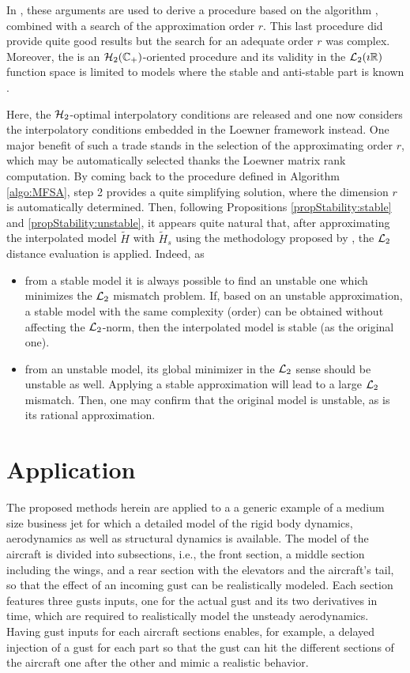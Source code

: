 \documentclass[graybox]{svmult}
\begin{document}
In \cite{PontesECC:2015}, these arguments are used to derive a procedure based on the \tfirka algorithm \cite{BeattieCDC:2012}, combined with a search of the approximation order $r$. This last procedure did provide quite good results but the search for an adequate order $r$ was complex. Moreover, the \tfirka is an ${\mathcal{H}_{2}}(\mathbb{C}_+)$-oriented procedure and its validity in the ${\mathcal{L}_{2}}(\imath\mathbb{R})$ function space is limited to models where the stable and anti-stable part is known \cite{Magruder:2010}. 

Here, the ${\mathcal{H}_{2}}$-optimal interpolatory conditions are released and one now considers the interpolatory conditions embedded in the Loewner framework instead. One major benefit of such a trade stands in the selection of the approximating order $r$, which may be automatically selected thanks the Loewner matrix rank computation. By coming back to the \mfsa procedure defined in Algorithm \ref{algo:MFSA}, step 2 provides a quite simplifying solution, where the dimension $r$ is automatically determined. Then, following Propositions \ref{propStability:stable} and \ref{propStability:unstable}, it appears quite natural that, after approximating the interpolated model $\tilde H$ with $\tilde H_s$ using the methodology proposed by \cite{Kohler:2014}, the ${\mathcal{L}_{2}}$ distance evaluation is applied. Indeed, as 
\begin{itemize}
	\item from a stable model it is always possible to find an unstable one which minimizes the ${\mathcal{L}_{2}}$ mismatch problem. If, based on an unstable approximation, a stable model with the same complexity (order) can be obtained without affecting the ${\mathcal{L}_{2}}$-norm, then the interpolated model is stable (as the original one).
	\item from an unstable model, its global minimizer in the ${\mathcal{L}_{2}}$ sense should be unstable as well. Applying a stable approximation will lead to a large ${\mathcal{L}_{2}}$ mismatch. Then, one may confirm that the original model is unstable, as is its rational approximation.
\end{itemize}


\section{Application}\label{sec:app}\vspace{-1mm}
The proposed methods herein are applied to a a generic example of a medium size business jet 
for which a detailed model of the rigid body dynamics, aerodynamics as well as structural dynamics is available.
The model of the aircraft is divided into subsections, i.e., the front section, a middle section including the wings, and a rear section with the elevators and the aircraft's tail, so that the effect of an incoming gust can be realistically modeled. Each section features three gusts inputs, one for the actual gust and its two derivatives in time, which are required to realistically model the unsteady aerodynamics. Having  gust inputs for each aircraft sections enables, for example, a delayed injection of a gust for each part  so that the gust can hit the different sections of the aircraft one after the other and mimic a realistic behavior.
\end{document}
